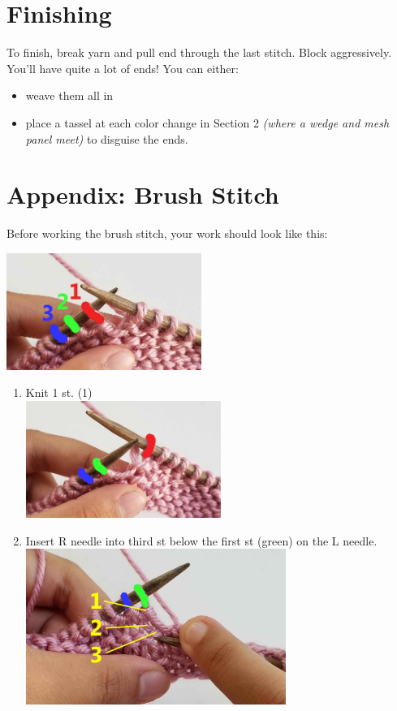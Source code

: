 \documentclass[12pt]{article}
\begin{document}
\begin{multicols}{2}
\normalsize
\section*{Finishing}
To finish, break yarn and pull end through the last stitch. Block aggressively. You'll have quite a lot of ends! You can either:
\vspace{-.5em}
\begin{itemize}[itemsep=0mm]
\item weave them all in
\item place a tassel at each color change in Section 2 \emph{(where a wedge and mesh panel meet)} to disguise the ends.
\end{itemize}

\section*{Appendix: Brush Stitch}

Before working the brush stitch, your work should look like this:

\begin{center} \includegraphics[height=1.5in]{0_setup.jpg}
\end{center}

\begin{enumerate}
\item Knit 1 st. (1) \\ \includegraphics[height=1.5in]{1_knit1.jpg}
\item Insert R needle into third st below the first st (green) on the L needle. \\ \includegraphics[height=2in]{2_insert.jpg}


\end{enumerate}
\end{multicols}
\end{document}
